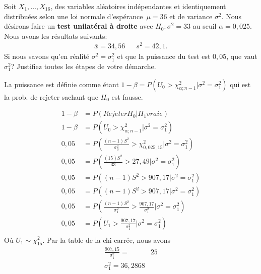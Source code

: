 \begin{questions}
\begin{parts}
\end{parts}





\newpage

\question[9] 
Soit $X_1,\hdots, X_{16}$, des variables aléatoires indépendantes et identiquement distribuées selon une loi normale d'espérance~$\mu=36$ et de variance $\sigma^2$.
Nous désirons faire un \textbf{test unilatéral à droite} avec $H_0:\sigma^2=33$ au seuil $\alpha = 0,025$.
Nous avons les résultats suivants:
\begin{align*}
    \overline{x}= 34,56 &  & s^2=42,1.
\end{align*}
Si nous savons qu'en réalité $\sigma^2=\sigma^2_1$ et que la puissance du test est $0,05$, que vaut $\sigma^2_1$?  Justifiez toutes les étapes de votre démarche.


\begin{solution}
    La puissance est définie comme étant $1-\beta=P(U_0>\chi^2_{\alpha;n-1}|\sigma^2=\sigma^2_1)$ qui est la prob. de rejeter sachant que $H_0$ est fausse.

    \begin{align*}
    1-\beta &= P(Rejeter H_0|H_1 vraie)\\
        1-\beta &= P(U_0>\chi^2_{\alpha;n-1}\big|\sigma^2=\sigma^2_1)\\
        0,05&= P\left(\frac{(n-1)S^2}{\sigma_0^2}>\chi^2_{0,025;15}\big|\sigma^2=\sigma^2_1\right)\\
        0,05&= P\left(\frac{(15)S^2}{33}>27,49\big|\sigma^2=\sigma^2_1\right)\\
        0,05&= P\left((n-1)S^2>907,17\big|\sigma^2=\sigma^2_1\right)\\
        0,05&= P\left((n-1)S^2>907,17\big|\sigma^2=\sigma^2_1\right)\\
        0,05&= P\left(\frac{(n-1)S^2}{\sigma^2_1}>\frac{907,17}{\sigma^2_1}\big|\sigma^2=\sigma^2_1\right)\\
        0,05&= P\left(U_1>\frac{907,17}{\sigma^2_1}\big|\sigma^2=\sigma^2_1\right)\\
    \end{align*}
Où $U_1\sim\chi^2_{15}$.
Par la table de la chi-carrée, nous avons
\begin{align*}
    \frac{907,15}{\sigma^2_1}=&25\\
    \sigma^2_1 =36,2868
\end{align*}
\end{solution}
\vfill


\end{questions}
